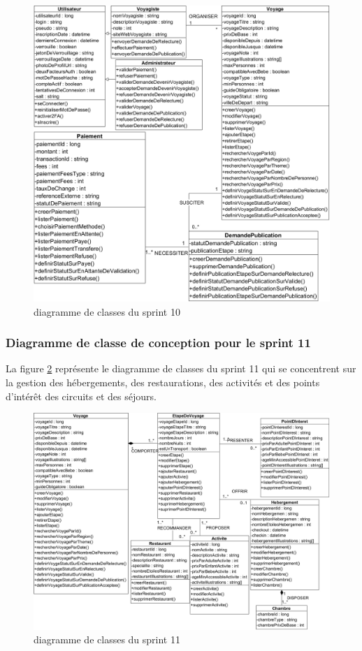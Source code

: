 \documentclass[12pt]{report}
\begin{document}
			\begin{figure}[h]
				\centering
				\includegraphics[width=\textwidth]{sprint10.jpg}
				\caption{diagramme de classes du sprint 10}
				\label{fig:sprint10}
			\end{figure}
			\FloatBarrier

			\subsubsection{Diagramme de classe de conception pour le sprint 11}
				
			\hspace{15pt} La figure \ref{fig:sprint11} représente le diagramme de classes du sprint 11 qui se concentrent sur  la gestion des hébergements, des restaurations, des activités et des points d'intérêt des circuits et des séjours.


			\begin{figure}[h]
				\centering
				\includegraphics[width=\textwidth]{sprint11.jpg}
				\caption{diagramme de classes du sprint 11}
				\label{fig:sprint11}
			\end{figure}
			\FloatBarrier
\end{document}
